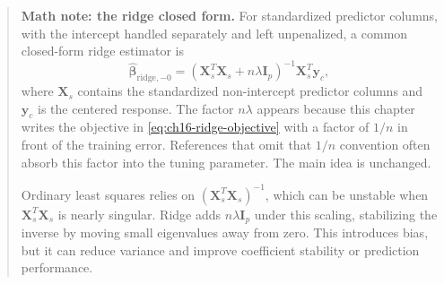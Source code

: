 \begin{quote}
\textbf{Math note: the ridge closed form.}
For standardized predictor columns, with the intercept handled separately and left unpenalized, a common closed-form ridge estimator is
\begin{equation}
  \widehat{\boldsymbol{\beta}}_{\mathrm{ridge},-0}
  =
  (\mathbf{X}_s^T\mathbf{X}_s+n\lambda \mathbf{I}_p)^{-1}
  \mathbf{X}_s^T\mathbf{y}_c,
  \label{eq:ch16-ridge-closed-form}
\end{equation}
where \(\mathbf{X}_s\) contains the standardized non-intercept predictor columns and \(\mathbf{y}_c\) is the centered response.  The factor \(n\lambda\) appears because this chapter writes the objective in \eqref{eq:ch16-ridge-objective} with a factor of \(1/n\) in front of the training error.  References that omit that \(1/n\) convention often absorb this factor into the tuning parameter.  The main idea is unchanged.

Ordinary least squares relies on \((\mathbf{X}_s^T\mathbf{X}_s)^{-1}\), which can be unstable when \(\mathbf{X}_s^T\mathbf{X}_s\) is nearly singular.  Ridge adds \(n\lambda\mathbf{I}_p\) under this scaling, stabilizing the inverse by moving small eigenvalues away from zero.  This introduces bias, but it can reduce variance and improve coefficient stability or prediction performance.
\end{quote}

